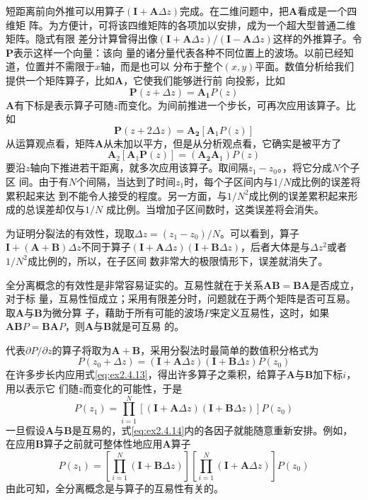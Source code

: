 短距离前向外推可以用算子$(\mathbf{I}+\mathbf{A}\Delta z)$完成。在二维问题中，把$\mathbf{A}$看成是一个四维矩
阵。为方便计，可将该四维矩阵的各项加以安排，成为一个超大型普通二维矩阵。隐式有限
差分计算曾得出像$(\mathbf{I}+\mathbf{A}\Delta z)/(\mathbf{I}-\mathbf{A}\Delta z)$这样的外推算子。令$\mathbf{P}$表示这样一个向量：该向
量的诸分量代表各种不同位置上的波场。以前已经知道，位置并不需限于$x$轴，而是也可以
分布于整个$(x,y)$平面。数值分析给我们提供一个矩阵算子，比如$\mathbf{A}$，它使我们能够迸行前
向投影，比如
\begin{equation*}
\mathbf{P}(z+\Delta z)=\mathbf{A_1}P(z)
\end{equation*}
$\mathbf{A}$有下标是表示算子可随$z$而变化。为间前推进一个步长，可再次应用该算子。比如
\begin{equation*}
\mathbf{P}(z+2\Delta z)=\mathbf{A_2}[\mathbf{A}_1P(z)]
\end{equation*}
从运算观点看，矩阵$\mathbf{A}$从未加以平方，但是从分析观点看，它确实是被平方了
\begin{equation*}
\mathbf{A}_2[\mathbf{A}_1\mathbf{P}(z)]=(\mathbf{A_2}\mathbf{A}_1)P(z)
\end{equation*}
要沿$z$轴向下推进若干距离，就多次应用该算子。取间隔$z_1-z_0$。，将它分成$N$个子区
间。由于有$N$个间隔，当达到了时间$z_1$时，每个子区间内与$1/N$成比例的误差将累积起来达
到不能令人接受的程度。另一方面，与$1/N^2$成比例的误差累积起来形成的总误差却仅与$1/N$
成比例。当增加子区间数时，这类误差将会消失。

为证明分裂法的有效性，现取$\Delta z=(z_1-z_0)/N$。可以看到，算子$\mathbf{I}+(\mathbf{A}+\mathbf{B})\Delta z$不同于算子$(\mathbf{I}+\mathbf{A}\Delta z)(\mathbf{I}+\mathbf{B}\Delta z)$，后者大体是与$\Delta z^2$或者$1/N^2$成比例的，所以，在子区间
数非常大的极限情形下，误差就消失了。

全分离概念的有效性是非常容易证实的。互易性就在于关系$\mathbf{AB}=
\mathbf{BA}$是否成立，对于标
量，互易性恒成立；采用有限差分时，问题就在于两个矩阵是否可互易。取$\mathbf{A}$与$\mathbf{B}$为微分算
子，藉助于所有可能的波场$P$来定义互易性，这时，如果$\mathbf{AB}P=\mathbf{BA}P$，则$\mathbf{A}$与$\mathbf{B}$就是可互易
的。

代表$\partial P/\partial z$的算子将取为$\mathbf{A}+\mathbf{B}$，采用分裂法时最简单的数值积分格式为
\begin{equation}
P(z_0+\Delta z)=(\mathbf{I}+\mathbf{A}\Delta z)(\mathbf{I}+\mathbf{B}\Delta z)P(z_0)
\label{eq:ex2.4.13}
\end{equation}
在许多步长内应用式\ref{eq:ex2.4.13}，得出许多算子之乘积，给算子$\mathbf{A}$与$\mathbf{B}$加下标$i$，用以表示它
们随$z$而变化的可能性，于是
\begin{equation}
P(z_1)=\prod_{i=1}^N[(\mathbf{I}+\mathbf{A}\Delta z)(\mathbf{I}+\mathbf{B}\Delta z)]P(z_0)
\label{eq:ex2.4.14}
\end{equation}
一旦假设$\mathbf{A}$与$\mathbf{B}$是互易的，式\ref{eq:ex2.4.14}内的各因子就能随意重新安排。例如，在应用$\mathbf{B}$算子之前就可整体性地应用$\mathbf{A}$算子
\begin{equation}
P(z_1)=[\prod_{i=1}^N(\mathbf{I}+\mathbf{B}\Delta z)][\prod_{i=1}^N(\mathbf{I}+\mathbf{A}\Delta z)]P(z_0)
\label{eq:ex2.4.15}
\end{equation}
由此可知，全分离概念是与算子的互易性有关的。

